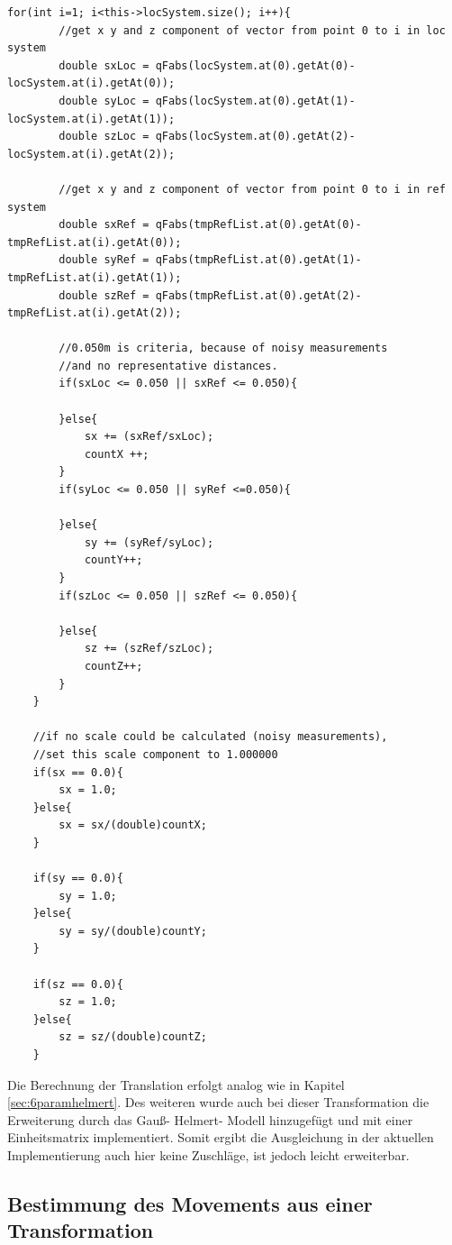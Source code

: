 \begin{lstlisting}[caption={Bestimmung der Maßstäbe für x, y und z},captionpos=t]
for(int i=1; i<this->locSystem.size(); i++){
        //get x y and z component of vector from point 0 to i in loc system
        double sxLoc = qFabs(locSystem.at(0).getAt(0)-locSystem.at(i).getAt(0));
        double syLoc = qFabs(locSystem.at(0).getAt(1)-locSystem.at(i).getAt(1));
        double szLoc = qFabs(locSystem.at(0).getAt(2)-locSystem.at(i).getAt(2));

        //get x y and z component of vector from point 0 to i in ref system
        double sxRef = qFabs(tmpRefList.at(0).getAt(0)-tmpRefList.at(i).getAt(0));
        double syRef = qFabs(tmpRefList.at(0).getAt(1)-tmpRefList.at(i).getAt(1));
        double szRef = qFabs(tmpRefList.at(0).getAt(2)-tmpRefList.at(i).getAt(2));

        //0.050m is criteria, because of noisy measurements
        //and no representative distances.
        if(sxLoc <= 0.050 || sxRef <= 0.050){

        }else{
            sx += (sxRef/sxLoc);
            countX ++;
        }
        if(syLoc <= 0.050 || syRef <=0.050){

        }else{
            sy += (syRef/syLoc);
            countY++;
        }
        if(szLoc <= 0.050 || szRef <= 0.050){

        }else{
            sz += (szRef/szLoc);
            countZ++;
        }
    }

    //if no scale could be calculated (noisy measurements),
    //set this scale component to 1.000000
    if(sx == 0.0){
        sx = 1.0;
    }else{
        sx = sx/(double)countX;
    }

    if(sy == 0.0){
        sy = 1.0;
    }else{
        sy = sy/(double)countY;
    }

    if(sz == 0.0){
        sz = 1.0;
    }else{
        sz = sz/(double)countZ;
    }
\end{lstlisting}
Die Berechnung der Translation erfolgt analog wie in Kapitel \ref{sec:6paramhelmert}. Des weiteren wurde auch bei dieser Transformation die Erweiterung durch das Gauß- Helmert- Modell hinzugefügt und mit einer Einheitsmatrix implementiert. Somit ergibt die Ausgleichung in der aktuellen Implementierung auch hier keine Zuschläge, ist jedoch leicht erweiterbar.

\subsection{Bestimmung des Movements aus einer Transformation}


